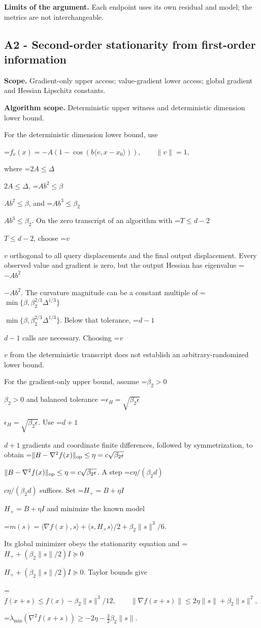 \documentclass[10pt,a4paper]{article}
\newcommand{\AtlasMath}[1]{\par\begingroup\centering\setbox0=\hbox{$\displaystyle #1$}\ifdim\wd0>1.4\linewidth\typeout{ATLAS WIDE FORMULA: \the\wd0}\fi\ifdim\wd0>\linewidth\resizebox{\linewidth}{!}{\box0}\else\box0\fi\par\endgroup}
\newcommand{\AtlasInlineMath}[1]{\begingroup\setbox0=\hbox{$#1$}\ifdim\wd0>.4\linewidth\endgroup\AtlasMath{#1}\else\endgroup$#1$\fi}
\begin{document}
\textbf{Limits of the argument.} Each endpoint uses its own residual and model; the metrics are not interchangeable.

\subsection{A2 - Second-order stationarity from first-order information}
\textbf{Scope.} Gradient-only upper access; value-gradient lower access; global gradient and Hessian Lipschitz constants.

\textbf{Algorithm scope.} Deterministic upper witness and deterministic dimension lower bound.

For the deterministic dimension lower bound, use

\AtlasMath{f_v(x)=-A(1-\cos(b\langle v,x-x_0\rangle)),\qquad\|v\|=1,}

where \AtlasInlineMath{2A\le\Delta}, \AtlasInlineMath{Ab^2\le\beta}, and \AtlasInlineMath{Ab^3\le\beta_2}. On the zero transcript of an algorithm with \AtlasInlineMath{T\le d-2}, choose \AtlasInlineMath{v} orthogonal to all query displacements and the final output displacement. Every observed value and gradient is zero, but the output Hessian has eigenvalue \AtlasInlineMath{-Ab^2}. The curvature magnitude can be a constant multiple of \AtlasInlineMath{\min\{\beta,\beta_2^{2/3}\Delta^{1/3}\}}. Below that tolerance, \AtlasInlineMath{d-1} calls are necessary. Choosing \AtlasInlineMath{v} from the deterministic transcript does not establish an arbitrary-randomized lower bound.

For the gradient-only upper bound, assume \AtlasInlineMath{\beta_2>0} and balanced tolerance \AtlasInlineMath{\epsilon_H=\sqrt{\beta_2\epsilon}}. Use \AtlasInlineMath{d+1} gradients and coordinate finite differences, followed by symmetrization, to obtain
\AtlasInlineMath{\|B-\nabla^2f(x)\|_{\rm op}\le\eta=c\sqrt{\beta_2\epsilon}}.
A step \AtlasInlineMath{c\eta/(\beta_2d)} suffices. Set \AtlasInlineMath{H_+=B+\eta I} and minimize the known model

\AtlasMath{m(s)=\langle\nabla f(x),s\rangle+\langle s,H_+s\rangle/2
+\beta_2\|s\|^3/6.}

Its global minimizer obeys the stationarity equation and
\AtlasInlineMath{H_++(\beta_2\|s\|/2)I\succeq0}.
Taylor bounds give

\AtlasMath{f(x+s)\le f(x)-\beta_2\|s\|^3/12,\qquad
\|\nabla f(x+s)\|\le2\eta\|s\|+\beta_2\|s\|^2,}


\AtlasMath{\lambda_{\min}(\nabla^2f(x+s))\ge-2\eta-\tfrac32\beta_2\|s\|.}
\end{document}
